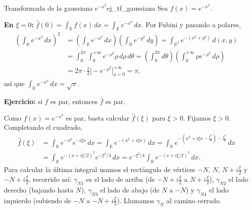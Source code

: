 \begin{ejemplo}{Transformada de la gaussiana $e^{-x^2}$}{ej_tf_gaussiana}
Sea $f(x) = e^{-x^2}$.

\textbf{En $\xi = 0$:} $\hat{f}(0) = \int_{\mathbb{R}}f(x)\,dx = \int_{\mathbb{R}}e^{-x^2}\,dx$. Por Fubini y pasando a polares,
\begin{align*}
\left(\int_{\mathbb{R}}e^{-x^2}\,dx\right)^2 &= \left(\int_{\mathbb{R}}e^{-x^2}\,dx\right)\left(\int_{\mathbb{R}}e^{-y^2}\,dy\right) = \int_{\mathbb{R}^2}e^{-(x^2+y^2)}\,d(x,y) \\
&= \int_0^{2\pi}\int_0^{+\infty}e^{-\rho^2}\rho\,d\rho\,d\theta = \left(\int_0^{2\pi}d\theta\right)\left(\int_0^{+\infty}\rho e^{-\rho^2}\,d\rho\right) \\
&= 2\pi\cdot\frac{1}{2}\Big[-e^{-\rho^2}\Big]_{\rho=0}^{+\infty} = \pi,
\end{align*}
así que $\int_{\mathbb{R}}e^{-x^2}\,dx = \sqrt{\pi}$.

\textbf{Ejercicio:} si $f$ es par, entonces $\hat{f}$ es par.

Como $f(x) = e^{-x^2}$ es par, basta calcular $\hat{f}(\xi)$ para $\xi > 0$. Fijamos $\xi > 0$. Completando el cuadrado,
\begin{align*}
\hat{f}(\xi) &= \int_{\mathbb{R}}e^{-x^2}e^{-i\xi x}\,dx = \int_{\mathbb{R}}e^{-(x^2+i\xi x)}\,dx = \int_{\mathbb{R}}e^{-(x^2+i\xi x - \frac{\xi^2}{4}) - \frac{\xi^2}{4}}\,dx \\
&= \int_{\mathbb{R}}e^{-(x+i\xi/2)^2}e^{-\xi^2/4}\,dx = e^{-\xi^2/4}\int_{\mathbb{R}}e^{-(x+i\xi/2)^2}\,dx.
\end{align*}
Para calcular la última integral usamos el rectángulo de vértices $-N$, $N$, $N + i\frac{\xi}{2}$ y $-N + i\frac{\xi}{2}$, recorrido así: $\gamma_{N1}$ es el lado de arriba (de $-N + i\frac{\xi}{2}$ a $N + i\frac{\xi}{2}$), $\gamma_{N2}$ el lado derecho (bajando hasta $N$), $\gamma_{N3}$ el lado de abajo (de $N$ a $-N$) y $\gamma_{N4}$ el lado izquierdo (subiendo de $-N$ a $-N + i\frac{\xi}{2}$). Llamamos $\gamma_N$ al camino cerrado.


\end{ejemplo}

